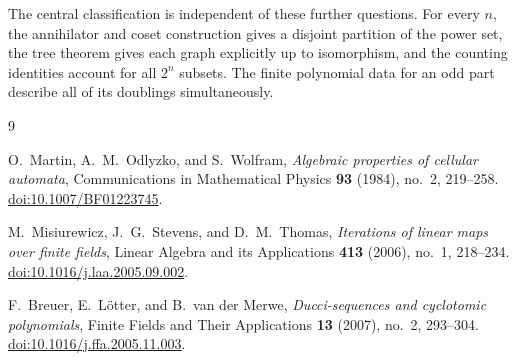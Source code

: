 \documentclass[11pt]{article}
\theoremstyle{definition}
\theoremstyle{remark}
\numberwithin{equation}{section}
\begin{document}
The central classification is independent of these further questions.
For every $n$, the annihilator and coset construction gives a disjoint
partition of the power set, the tree theorem gives each graph explicitly
up to isomorphism, and the counting identities account for all $2^n$
subsets. The finite polynomial data for an odd part describe all of its
doublings simultaneously.

\begin{thebibliography}{9}

O.~Martin, A.~M.~Odlyzko, and S.~Wolfram,
\emph{Algebraic properties of cellular automata},
Communications in Mathematical Physics \textbf{93} (1984), no.~2,
219--258.
\href{https://doi.org/10.1007/BF01223745}{doi:10.1007/BF01223745}.

M.~Misiurewicz, J.~G.~Stevens, and D.~M.~Thomas,
\emph{Iterations of linear maps over finite fields},
Linear Algebra and its Applications \textbf{413} (2006), no.~1,
218--234.
\href{https://doi.org/10.1016/j.laa.2005.09.002}{doi:10.1016/j.laa.2005.09.002}.

F.~Breuer, E.~L\"otter, and B.~van der Merwe,
\emph{Ducci-sequences and cyclotomic polynomials},
Finite Fields and Their Applications \textbf{13} (2007), no.~2,
293--304.
\href{https://doi.org/10.1016/j.ffa.2005.11.003}{doi:10.1016/j.ffa.2005.11.003}.

\end{thebibliography}
\end{document}
